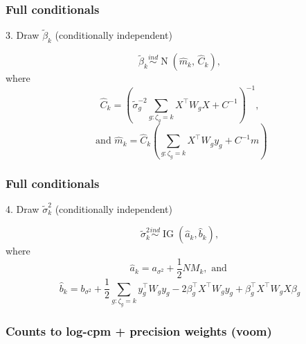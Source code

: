 \documentclass{beamer}
\newcommand{\op}{\operatorname}
\newcommand{\ind}{\stackrel{ind}{\sim}}
\begin{document}
\begin{frame}%
  \frametitle{Full conditionals}
  3. Draw $\tilde{\beta}_k$ (conditionally independent)
  
  \[\tilde{\beta}_k \ind \op{N}(\hat{m}_k,\, \hat{C}_k),\]
  where
  \[\hat{C}_k= \left( \tilde{\sigma}^{-2}_g\sum_{g:\zeta_g=k}
    X^\top W_g X + C^{-1} \right)^{-1},\]
  \[\mbox{ and }\hat{m}_k=\hat{C}_k \left(\sum_{g:\zeta_g=k} X^\top W_g y_g +
        C^{-1}m \right)\]
\end{frame}

\begin{frame}%
  \frametitle{Full conditionals}
  4. Draw $\tilde{\sigma}_k^2$ (conditionally independent)
  
  \[\tilde{\sigma}_k^2 \ind \op{IG}(\hat{a}_k,\hat{b}_k),\]
  where
  \[\hat{a}_k = a_{\sigma^2} + \frac{1}{2}NM_k,\mbox{ and }\]
  \[\hat{b}_k= b_{\sigma^2} + \frac{1}{2}\sum_{g:\zeta_g=k}y_g^\top W_g y_g -2 \beta_g^\top X^\top W_g y_g  +\beta_g^\top X^\top W_g X \beta_g\]
\end{frame}


\begin{frame}%
  \frametitle{Counts to log-cpm + precision weights (voom)}
  \centering
\end{frame}
\end{document}
